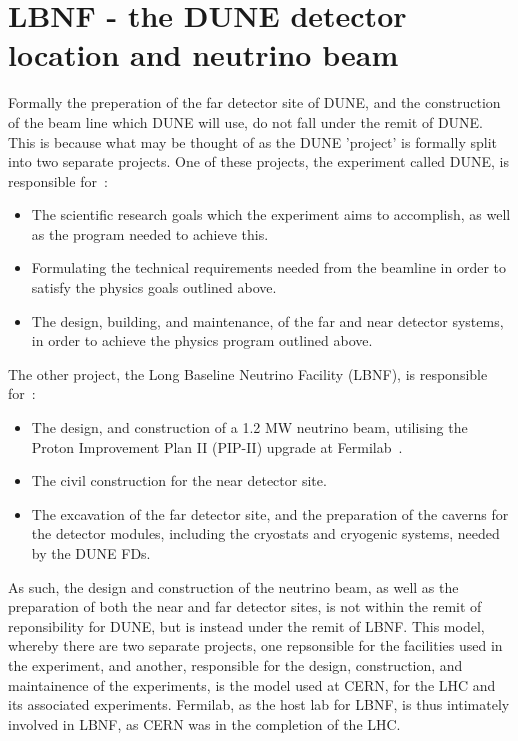 \section{LBNF - the DUNE detector location and neutrino beam} \label{sec:DUNE_LBNF} %
Formally the preperation of the far detector site of DUNE, and the construction of the beam line which DUNE will use, do not fall under the remit of DUNE. This is because what may be thought of as the DUNE 'project' is formally split into two separate projects. One of these projects, the experiment called DUNE, is responsible for~\citep{DUNECDR_V1}:
\begin{itemize}
\item The scientific research goals which the experiment aims to accomplish, as well as the program needed to achieve this.
\item Formulating the technical requirements needed from the beamline in order to satisfy the physics goals outlined above.
\item The design, building, and maintenance, of the far and near detector systems, in order to achieve the physics program outlined above.  
\end{itemize}
The other project, the Long Baseline Neutrino Facility (LBNF), is responsible for~\citep{DUNECDR_V1}:
\begin{itemize}
\item The design, and construction of a 1.2 MW neutrino beam, utilising the Proton Improvement Plan II (PIP-II) upgrade at Fermilab~\citep{PIP-II}.
\item The civil construction for the near detector site.
\item The excavation of the far detector site, and the preparation of the caverns for the detector modules, including the cryostats and cryogenic systems, needed by the DUNE FDs.
\end{itemize}
As such, the design and construction of the neutrino beam, as well as the preparation of both the near and far detector sites, is not within the remit of reponsibility for DUNE, but is instead under the remit of LBNF. This model, whereby there are two separate projects, one repsonsible for the facilities used in the experiment, and another, responsible for the design, construction, and maintainence of the experiments, is the model used at CERN, for the LHC and its associated experiments. Fermilab, as the host lab for LBNF, is thus intimately involved in LBNF, as CERN was in the completion of the LHC. \\

